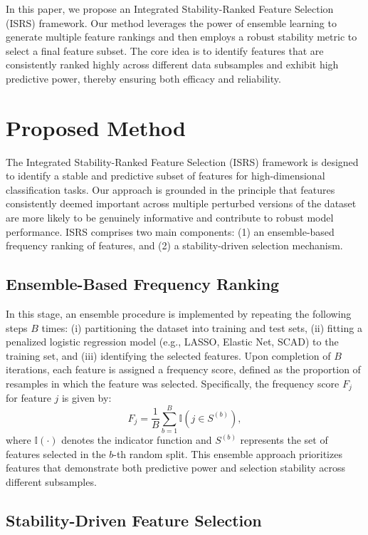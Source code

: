 \documentclass[twoside]{article}
\begin{document}
In this paper, we propose an Integrated Stability-Ranked Feature Selection (ISRS) framework. Our method leverages the power of ensemble learning to generate multiple feature rankings and then employs a robust stability metric to select a final feature subset. The core idea is to identify features that are consistently ranked highly across different data subsamples and exhibit high predictive power, thereby ensuring both efficacy and reliability. 


\section{Proposed Method}
The Integrated Stability-Ranked Feature Selection (ISRS) framework is designed to identify a stable and predictive subset of features for high-dimensional classification tasks. Our approach is grounded in the principle that features consistently deemed important across multiple perturbed versions of the dataset are more likely to be genuinely informative and contribute to robust model performance. ISRS comprises two main components: (1) an ensemble-based frequency ranking of features, and (2) a stability-driven selection mechanism.

\subsection{Ensemble-Based Frequency Ranking}

In this stage, an ensemble procedure is implemented by repeating the following steps $B$ times: 
(i) partitioning the dataset into training and test sets, 
(ii) fitting a penalized logistic regression model (e.g., LASSO, Elastic Net, SCAD) to the training set, and
(iii) identifying the selected features. Upon completion of $B$ iterations, each feature is assigned a frequency score, defined as the proportion of resamples in which the feature was selected. Specifically, the frequency score $F_j$ for feature $j$ is given by:
\begin{equation}
F_j = \frac{1}{B} \sum_{b=1}^B \mathbb{I}(j \in S^{(b)}),
\end{equation}
where $\mathbb{I}(\cdot)$ denotes the indicator function and $S^{(b)}$ represents the set of features selected in the $b$-th random split. This ensemble approach prioritizes features that demonstrate both predictive power and selection stability across different subsamples.

\subsection{Stability-Driven Feature Selection}
\end{document}
